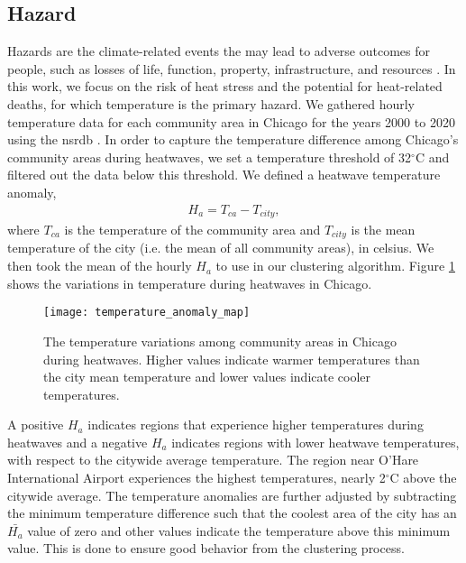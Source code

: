 \subsection{Hazard}

Hazards are the climate-related events the may lead to adverse outcomes for people,
such as losses of life, function, property, infrastructure, and resources
\cite{viner_understanding_2020}. In this work, we focus on the risk of heat stress
and the potential for heat-related deaths, for which temperature is the primary
hazard. We gathered hourly temperature data for each community area in Chicago for the
years 2000 to 2020 using the \ac{nsrdb} \cite{sengupta_national_2018}. In order
to capture the temperature difference among Chicago's community areas during heatwaves,
we set a temperature threshold of 32$^\circ$C and filtered out the data below this
threshold. We defined a heatwave temperature anomaly,
\begin{eqnarray}
  H_a = T_{ca} - T_{city},
\end{eqnarray}
where $T_{ca}$ is the temperature of the community area and $T_{city}$ is the
mean temperature of the city (i.e. the mean of all community areas), in celsius.
We then took the mean of the hourly $H_a$ to use in our clustering algorithm.
Figure \ref{fig:ha_map} shows the variations in temperature during heatwaves in
Chicago.

\begin{figure}[H]
    \begin{center}
      \texttt{[image: temperature\_anomaly\_map]}
      \caption{The temperature variations among community areas in Chicago during
      heatwaves. Higher values indicate warmer temperatures than the city mean
      temperature and lower values indicate cooler temperatures.}
      \label{fig:ha_map}

    \end{center}
\end{figure}

A positive $H_a$ indicates regions that experience higher temperatures during
heatwaves and a negative $H_a$ indicates regions with lower heatwave temperatures,
with respect to the citywide average temperature.
The region near O'Hare International Airport experiences the highest temperatures,
nearly 2$^\circ$C above the citywide average. The temperature anomalies are further
adjusted by subtracting the minimum temperature difference such that the
coolest area of the city has an $\bar{H_a}$ value of zero and other values indicate
the temperature above this minimum value. This is done to ensure good behavior
from the clustering process.

